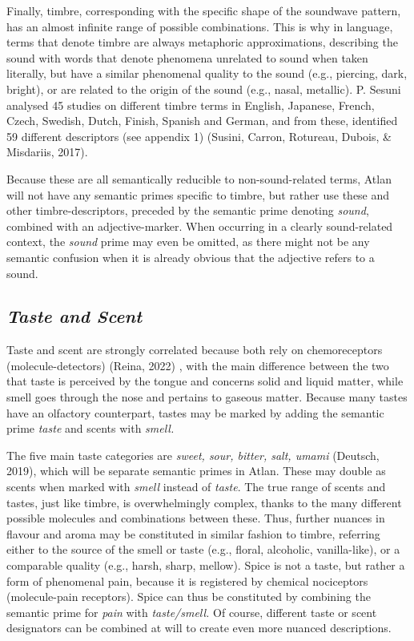 Finally, timbre, corresponding with the specific shape of the soundwave pattern, has an almost infinite range of possible combinations. This is why in language, terms that denote timbre are always metaphoric approximations, describing the sound with words that denote phenomena unrelated to sound when taken literally, but have a similar phenomenal quality to the sound (e.g., piercing, dark, bright), or are related to the origin of the sound (e.g., nasal, metallic). P. Sesuni analysed 45 studies on different timbre terms in English, Japanese, French, Czech, Swedish, Dutch, Finish, Spanish and German, and from these, identified 59 different descriptors (see appendix 1) (Susini, Carron, Rotureau, Dubois, \& Misdariis, 2017). 

Because these are all semantically reducible to non-sound-related terms, Atlan will not have any semantic primes specific to timbre, but rather use these and other timbre-descriptors, preceded by the semantic prime denoting \textit{sound}, combined with an adjective-marker. When occurring in a clearly sound-related context, the \textit{sound} prime may even be omitted, as there might not be any semantic confusion when it is already obvious that the adjective refers to a sound. 


\subsection{\it Taste and Scent}

\noindent Taste and scent are strongly correlated because both rely on chemoreceptors (molecule-detectors) (Reina, 2022) , with the main difference between the two that taste is perceived by the tongue and concerns solid and liquid matter, while smell goes through the nose and pertains to gaseous matter. Because many tastes have an olfactory counterpart, tastes may be marked by adding the semantic prime \textit{taste} and scents with \textit{smell.} 

The five main taste categories are \textit{sweet, sour, bitter, salt, umami}  (Deutsch, 2019), which will be separate semantic primes in Atlan. These may double as scents when marked with \textit{smell} instead of \textit{taste}. The true range of scents and tastes, just like timbre, is overwhelmingly complex, thanks to the many different possible molecules and combinations between these. Thus, further nuances in flavour and aroma may be constituted in similar fashion to timbre, referring either to the source of the smell or taste (e.g., floral, alcoholic, vanilla-like), or a comparable quality (e.g., harsh, sharp, mellow). Spice is not a taste, but rather a form of phenomenal pain, because it is registered by chemical nociceptors (molecule-pain receptors). Spice can thus be constituted by combining the semantic prime for \textit{pain} with \textit{taste/smell.} Of course, different taste or scent designators can be combined at will to create even more nuanced descriptions. 

